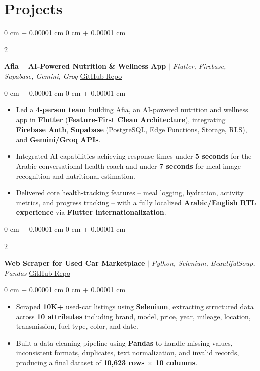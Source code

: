 \documentclass[9pt, letterpaper]{extarticle}
\newenvironment{highlights}{
    \begin{itemize}[
        topsep=0.06 cm,
        parsep=0.06 cm,
        partopsep=0pt,
        itemsep=0pt,
        leftmargin=0 cm + 10pt
    ]
}{
    \end{itemize}
} %
\newenvironment{onecolentry}{
    \begin{adjustwidth}{
        0 cm + 0.00001 cm
    }{
        0 cm + 0.00001 cm
    }
}{
    \end{adjustwidth}
} %
\newenvironment{twocolentry}[2][]{
    \onecolentry
    \def\secondColumn{#2}
    \setcolumnwidth{\fill, 4.5 cm}
    \begin{paracol}{2}
}{
    \switchcolumn \raggedleft \secondColumn
    \end{paracol}
    \endonecolentry
} %
\begin{document}
    \section{Projects}

        \begin{twocolentry}{
            \href{https://github.com/abdellatif72/NutriVision-AI-Driven-Dietary-Health-Assistant-T4}{\underline{GitHub Repo}}
        }
            \textbf{Afia -- AI-Powered Nutrition \& Wellness App} $|$ \textit{Flutter, Firebase, Supabase, Gemini, Groq}\end{twocolentry}

        \begin{onecolentry}
            \begin{highlights}
                \item Led a \textbf{4-person team} building Afia, an AI-powered nutrition and wellness app in \textbf{Flutter} (\textbf{Feature-First Clean Architecture}), integrating \textbf{Firebase Auth}, \textbf{Supabase} (PostgreSQL, Edge Functions, Storage, RLS), and \textbf{Gemini/Groq APIs}.
                \item Integrated AI capabilities achieving response times under \textbf{5 seconds} for the Arabic conversational health coach and under \textbf{7 seconds} for meal image recognition and nutritional estimation.
                \item Delivered core health-tracking features -- meal logging, hydration, activity metrics, and progress tracking -- with a fully localized \textbf{Arabic/English RTL experience} via \textbf{Flutter internationalization}.
            \end{highlights}
        \end{onecolentry}

        \begin{twocolentry}{
            \href{https://github.com/abdellatif72/Htla2ee-Streamlit-app}{\underline{GitHub Repo}}
        }
            \textbf{Web Scraper for Used Car Marketplace} $|$ \textit{Python, Selenium, BeautifulSoup, Pandas}\end{twocolentry}

        \begin{onecolentry}
            \begin{highlights}
                \item Scraped \textbf{10K+} used-car listings using \textbf{Selenium}, extracting structured data across \textbf{10 attributes} including brand, model, price, year, mileage, location, transmission, fuel type, color, and date.
                \item Built a data-cleaning pipeline using \textbf{Pandas} to handle missing values, inconsistent formats, duplicates, text normalization, and invalid records, producing a final dataset of \textbf{10,623 rows $\times$ 10 columns}.
            \end{highlights}
        \end{onecolentry}
\end{document}
